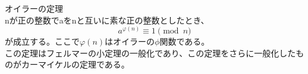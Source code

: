 \documentclass[fleqn,leqno,autodetect-engine,dvipdfmxi-if-dvi,ja=standard]{bxjsarticle}
\begin{document}
オイラーの定理\\

nが正の整数でaをnと互いに素な正の整数としたとき、
\begin{displaymath}
a^{\varphi (n)} \equiv 1 \pmod{n}
\end{displaymath}
が成立する。ここで$\varphi (n)$はオイラーの$ \phi $関数である。\\

この定理はフェルマーの小定理の一般化であり、この定理をさらに一般化したものがカーマイケルの定理である。
\end{document}
